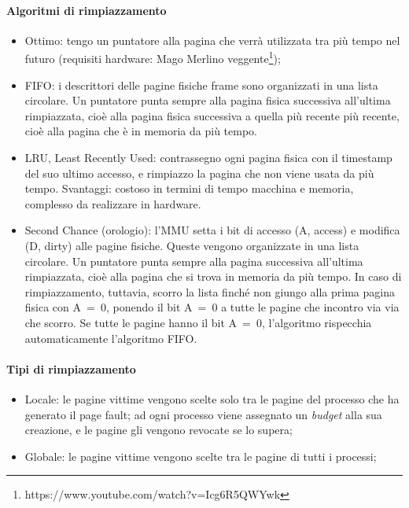 \documentclass[12pt,a4paper]{article}
\begin{document}
\paragraph{Algoritmi di rimpiazzamento}
\begin{itemize}
  \item Ottimo: tengo un puntatore alla pagina che verrà
    utilizzata tra più tempo nel futuro (requisiti hardware:
    Mago Merlino veggente\footnote{https://www.youtube.com/watch?v=Icg6R5QWYwk});
  \item FIFO: i descrittori delle pagine fisiche frame sono organizzati
    in una lista circolare. Un puntatore punta sempre alla pagina
    fisica successiva all'ultima rimpiazzata, cioè alla pagina fisica
    successiva a quella più recente più recente, cioè alla pagina che è
    in memoria da più tempo.
  \item LRU, Least Recently Used: contrassegno ogni pagina fisica con il
    timestamp del suo ultimo accesso, e rimpiazzo la pagina che
    non viene usata da più tempo. Svantaggi: costoso in termini
    di tempo macchina e memoria, complesso da realizzare in
    hardware.
  \item Second Chance (orologio): l'MMU setta i bit di accesso
    (A, access) e modifica (D, dirty) alle pagine fisiche. Queste
    vengono organizzate in una lista circolare. Un puntatore punta
    sempre alla pagina successiva all'ultima rimpiazzata, cioè alla
    pagina che si trova in memoria da più tempo. In caso di
    rimpiazzamento, tuttavia, scorro la lista finché non giungo alla
    prima pagina fisica con A~=~0, ponendo il bit A~=~0 a tutte le
    pagine che incontro via via che scorro. Se tutte le pagine hanno il
    bit A~=~0, l'algoritmo rispecchia automaticamente l'algoritmo FIFO.
\end{itemize}

\paragraph{Tipi di rimpiazzamento}
\begin{itemize}
  \item Locale: le pagine vittime vengono scelte solo tra le pagine
    del processo che ha generato il page fault; ad ogni processo viene
    assegnato un \emph{budget} alla sua creazione, e le pagine gli
    vengono revocate se lo supera;
  \item Globale: le pagine vittime vengono scelte tra le pagine di
    tutti i processi;
\end{itemize}
\end{document}
